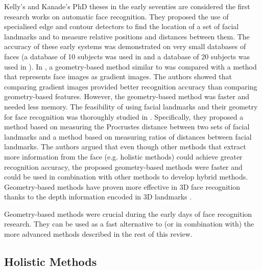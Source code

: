 \documentclass[conference]{IEEEtran}
\begin{document}
Kelly's \cite{kelly1970visual} and Kanade's \cite{kanade1973picture} PhD theses in the early seventies are considered the first research works on automatic face recognition. They proposed the use of specialised edge and contour detectors to find the location of a set of facial landmarks and to measure relative positions and distances between them. The accuracy of these early systems was demonstrated on very small databases of faces (a database of 10 subjects was used in \cite{kelly1970visual} and a database of 20 subjects was used in \cite{kanade1973picture}). In \cite{brunelli1993face}, a geometry-based method similar to \cite{kanade1973picture} was compared with a method that represents face images as gradient images. The authors showed that comparing gradient images provided better recognition accuracy than comparing geometry-based features. However, the geometry-based method was faster and needed less memory. The feasibility of using facial landmarks and their geometry for face recognition was thoroughly studied in \cite{shi2006effective}. Specifically, they proposed a method based on measuring the Procrustes distance \cite{dryden1998statistical} between two sets of facial landmarks and a method based on measuring ratios of distances between facial landmarks. The authors argued that even though other methods that extract more information from the face (e.g. holistic methods) could achieve greater recognition accuracy, the proposed geometry-based methods were faster and could be used in combination with other methods to develop hybrid methods. Geometry-based methods have proven more effective in 3D face recognition thanks to the depth information encoded in 3D landmarks \cite{daniyal2009compact,gupta2010anthropometric}.

Geometry-based methods were crucial during the early days of face recognition research. They can be used as a fast alternative to (or in combination with) the more advanced methods described in the rest of this review.

\subsection{Holistic Methods}
\label{holistic_methods}
\end{document}
